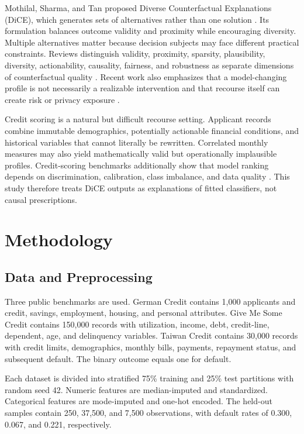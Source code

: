 \documentclass[conference]{IEEEtran}
\begin{document}
Mothilal, Sharma, and Tan proposed Diverse Counterfactual Explanations (DiCE), which generates sets of alternatives rather than one solution \cite{mothilal2020dice}. Its formulation balances outcome validity and proximity while encouraging diversity. Multiple alternatives matter because decision subjects may face different practical constraints. Reviews distinguish validity, proximity, sparsity, plausibility, diversity, actionability, causality, fairness, and robustness as separate dimensions of counterfactual quality \cite{verma2020review,keane2021deficits,jiang2024robust}. Recent work also emphasizes that a model-changing profile is not necessarily a realizable intervention and that recourse itself can create risk or privacy exposure \cite{karimi2021interventions,fokkema2024risks,pawelczyk2023privacy}.

Credit scoring is a natural but difficult recourse setting. Applicant records combine immutable demographics, potentially actionable financial conditions, and historical variables that cannot literally be rewritten. Correlated monthly measures may also yield mathematically valid but operationally implausible profiles. Credit-scoring benchmarks additionally show that model ranking depends on discrimination, calibration, class imbalance, and data quality \cite{lessmann2015benchmark,yeh2009taiwan}. This study therefore treats DiCE outputs as explanations of fitted classifiers, not causal prescriptions.

\section{Methodology}
\subsection{Data and Preprocessing}
Three public benchmarks are used. German Credit contains 1,000 applicants and credit, savings, employment, housing, and personal attributes. Give Me Some Credit contains 150,000 records with utilization, income, debt, credit-line, dependent, age, and delinquency variables. Taiwan Credit contains 30,000 records with credit limits, demographics, monthly bills, payments, repayment status, and subsequent default. The binary outcome equals one for default.

Each dataset is divided into stratified 75\% training and 25\% test partitions with random seed 42. Numeric features are median-imputed and standardized. Categorical features are mode-imputed and one-hot encoded. The held-out samples contain 250, 37,500, and 7,500 observations, with default rates of 0.300, 0.067, and 0.221, respectively.
\end{document}

